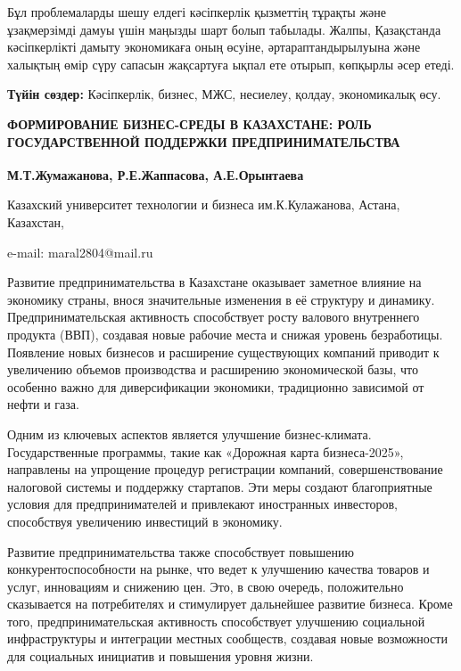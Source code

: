 Бұл проблемаларды шешу елдегі кәсіпкерлік қызметтің тұрақты және
ұзақмерзімді дамуы үшін маңызды шарт болып табылады. Жалпы, Қазақстанда
кәсіпкерлікті дамыту экономикаға оның өсуіне, әртараптандырылуына және
халықтың өмір сүру сапасын жақсартуға ықпал ете отырып, көпқырлы әсер
етеді.

{\bfseries Түйін сөздер:} Кәсіпкерлік, бизнес, МЖС, несиелеу, қолдау,
экономикалық өсу.
\begin{articleheader}

{\bfseries ФОРМИРОВАНИЕ БИЗНЕС-СРЕДЫ В КАЗАХСТАНЕ: РОЛЬ ГОСУДАРСТВЕННОЙ ПОДДЕРЖКИ ПРЕДПРИНИМАТЕЛЬСТВА}

{\bfseries М.Т.Жумажанова\textsuperscript{\envelope }, Р.Е.Жаппасова, А.Е.Орынтаева}
\end{articleheader}
\begin{affiliation}

Казахский университет технологии и бизнеса им.К.Кулажанова, Астана,
Казахстан,

e-mail: maral2804@mail.ru
\end{affiliation}

Развитие предпринимательства в Казахстане оказывает заметное влияние на
экономику страны, внося значительные изменения в её структуру и
динамику. Предпринимательская активность способствует росту валового
внутреннего продукта (ВВП), создавая новые рабочие места и снижая
уровень безработицы. Появление новых бизнесов и расширение существующих
компаний приводит к увеличению объемов производства и расширению
экономической базы, что особенно важно для диверсификации экономики,
традиционно зависимой от нефти и газа.

Одним из ключевых аспектов является улучшение бизнес-климата.
Государственные программы, такие как «Дорожная карта бизнеса-2025»,
направлены на упрощение процедур регистрации компаний, совершенствование
налоговой системы и поддержку стартапов. Эти меры создают благоприятные
условия для предпринимателей и привлекают иностранных инвесторов,
способствуя увеличению инвестиций в экономику.

Развитие предпринимательства также способствует повышению
конкурентоспособности на рынке, что ведет к улучшению качества товаров и
услуг, инновациям и снижению цен. Это, в свою очередь, положительно
сказывается на потребителях и стимулирует дальнейшее развитие бизнеса.
Кроме того, предпринимательская активность способствует улучшению
социальной инфраструктуры и интеграции местных сообществ, создавая новые
возможности для социальных инициатив и повышения уровня жизни.

